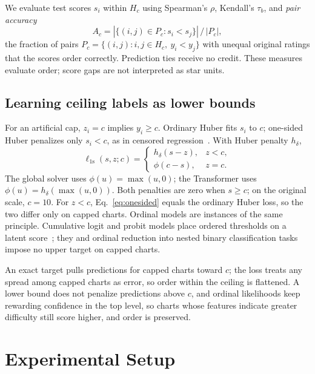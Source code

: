 \documentclass{article}
\begin{document}
We evaluate test scores $s_i$ within $H_c$ using Spearman's $\rho$, Kendall's
$\tau_b$, and \emph{pair accuracy}
\begin{equation}
 A_c=|\{(i,j)\in P_c:s_i<s_j\}|\,/\,|P_c|,
 \label{eq:pairacc}
\end{equation}
the fraction of pairs $P_c=\{(i,j):i,j\in H_c,\ y_i<y_j\}$ with unequal
original ratings that the scores order correctly. Prediction ties receive no
credit. These measures evaluate
order; score gaps are not interpreted as star units.

\subsection{Learning ceiling labels as lower bounds}
\label{sec:lowerbound}
For an artificial cap, $z_i=c$ implies $y_i\geq c$. Ordinary Huber fits
$s_i$ to $c$; one-sided Huber penalizes only $s_i<c$, as in censored
regression~\cite{tobin1958,danaila2024censored}. With Huber penalty $h_\delta$,
\begin{equation}
 \ell_{\mathrm{1s}}(s,z;c)=
 \begin{cases}
   h_\delta(s-z),&z<c,\\
   \phi(c-s),&z=c.
 \end{cases}
 \label{eq:onesided}
\end{equation}
The global solver uses $\phi(u)=\max(u,0)$; the Transformer uses
$\phi(u)=h_\delta(\max(u,0))$. Both penalties are zero when $s\geq c$; on
the original scale, $c=10$. For $z<c$, Eq.~\eqref{eq:onesided} equals the
ordinary Huber loss, so the two differ only on capped charts.
Ordinal models are instances of the same principle. Cumulative logit and
probit models place ordered thresholds on a latent
score~\cite{mccullagh1980}; they and ordinal reduction into nested binary
classification tasks impose no upper target on capped charts.

An exact target pulls
predictions for capped charts toward $c$; the loss treats any spread among
capped charts as error, so order within the ceiling is flattened. A lower
bound does not penalize predictions above $c$, and ordinal likelihoods keep
rewarding confidence in the top level, so charts whose features indicate
greater difficulty still score higher, and order is preserved.

\section{Experimental Setup}
\end{document}
